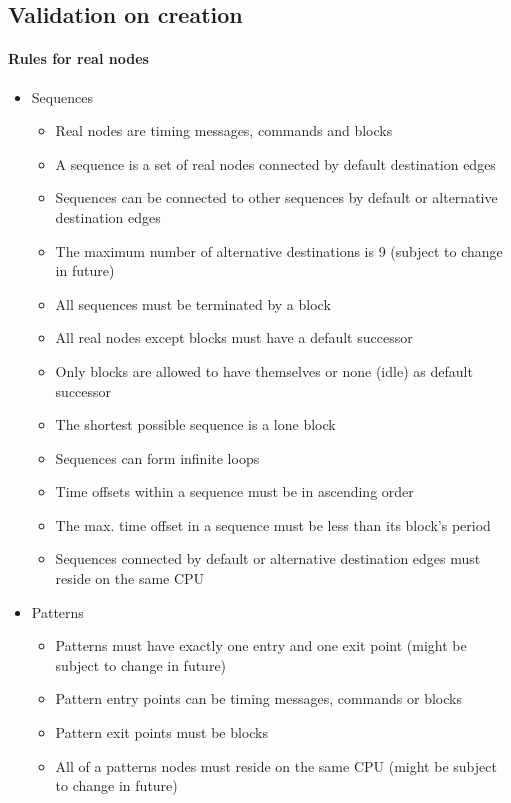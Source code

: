 \subsection{Validation on creation}
\paragraph{Rules for real nodes}
\begin{itemize}
  \item{Sequences}
  \begin{itemize}
    \item{Real nodes are timing messages, commands and blocks}
    \item{A sequence is a set of real nodes connected by default destination edges}
    \item{Sequences can be connected to other sequences by default or alternative destination edges}
    \item{The maximum number of alternative destinations is 9 (subject to change in future)}
    \item{All sequences must be terminated by a block}
    \item{All real nodes except blocks must have a default successor}
    \item{Only blocks are allowed to have themselves or none (idle) as default successor}
    \item{The shortest possible sequence is a lone block}
    \item{Sequences can form infinite loops}
    \item{Time offsets within a sequence must be in ascending order}
    \item{The max. time offset in a sequence must be less than its block's period}
    \item{Sequences connected by default or alternative destination edges must reside on the same CPU}
\end{itemize}
  \item{Patterns}
  \begin{itemize}
    \item{Patterns must have exactly one entry and one exit point (might be subject to change in future)}
    \item{Pattern entry points can be timing messages, commands or blocks}
    \item{Pattern exit points must be blocks}
    \item{All of a patterns nodes must reside on the same CPU (might be subject to change in future)}

\end{itemize}
\end{itemize}
